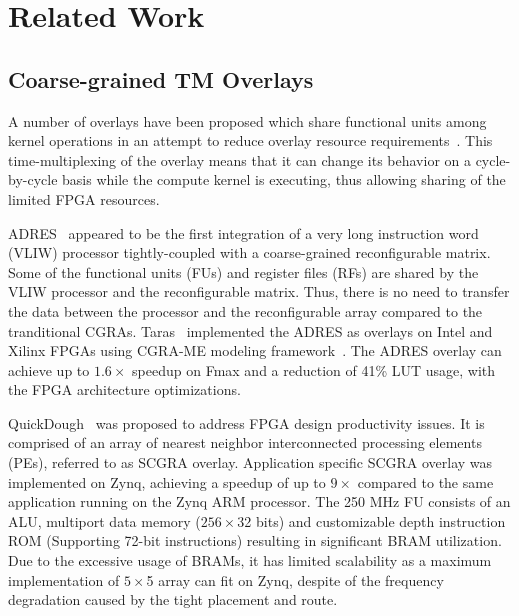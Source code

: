 \section{Related Work}
\label{section_2}


\subsection{Coarse-grained TM Overlays}
A number of overlays have been proposed which share functional units among kernel operations in an attempt to reduce overlay resource requirements~\cite{severance2013embedded, liu2015quickdough, taras2019impact}.
This time-multiplexing of the overlay means that it can change its behavior on a cycle-by-cycle basis while the compute kernel is executing, thus allowing sharing of the limited FPGA resources.


ADRES~\cite{mei2003adres} appeared to be the first integration of a very long instruction word (VLIW) processor tightly-coupled with a coarse-grained reconfigurable matrix. 
Some of the functional units (FUs) and register files (RFs) are shared by the VLIW processor and the reconfigurable matrix. 
Thus, there is no need to transfer the data between the processor and the reconfigurable array compared to the tranditional CGRAs. 
Taras~\cite{taras2019impact} implemented the ADRES as overlays on Intel and Xilinx FPGAs using CGRA-ME modeling framework~\cite{chin2017cgra}. 
The ADRES overlay can achieve up to $1.6\times$ speedup on Fmax and a reduction of 41\% LUT usage, with the FPGA architecture optimizations. 


QuickDough~\cite{liu2015quickdough} was proposed to address FPGA design productivity issues. 
It is comprised of an array of nearest neighbor interconnected processing elements (PEs), referred to as SCGRA overlay.  
Application specific SCGRA overlay was implemented on Zynq, achieving a speedup of up to $9\times$ compared to the same application running on the Zynq ARM processor. 
The 250 MHz FU consists of an ALU, multiport data memory ($256\times$32 bits) and customizable depth instruction ROM (Supporting 72-bit instructions) resulting in significant BRAM utilization. 
Due to the excessive usage of BRAMs, it has limited scalability as a maximum implementation of $5\times$5 array can fit on Zynq, despite of the frequency degradation caused by the tight placement and route. 


